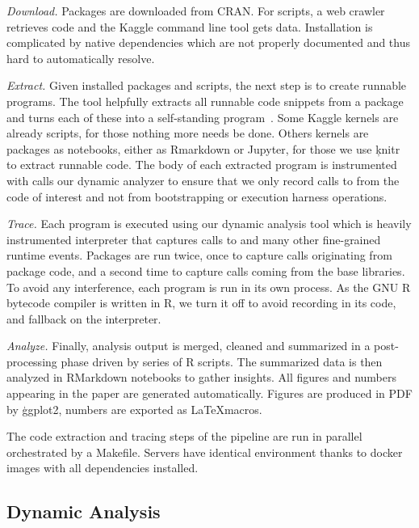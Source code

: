 \documentclass[screen,acmsmall]{acmart}
\begin{document}
\medskip
\begin{compactenum}
\item \emph{Download.} Packages are downloaded from CRAN. For scripts, a web
  crawler retrieves code and the Kaggle command line tool gets data.
  Installation is complicated by native dependencies which are not properly
  documented and thus hard to automatically resolve.
\item \emph{Extract.} Given installed packages and scripts, the next step is to
  create runnable programs. The \genthat tool helpfully extracts all runnable
  code snippets from a package and turns each of these into a self-standing
  program~\cite{issta18}. Some Kaggle kernels are already scripts, for those
  nothing more needs be done. Others kernels are packages as notebooks, either
  as Rmarkdown or Jupyter, for those we use \c{knitr} to extract runnable code.
  The body of each extracted program is instrumented with calls our dynamic
  analyzer to ensure that we only record calls to \eval from the code of
  interest and not from bootstrapping or execution harness operations.
\item \emph{Trace.} Each program is executed using our dynamic analysis tool
  which is heavily instrumented interpreter that captures calls to \eval and
  many other fine-grained runtime events. Packages are run twice, once to
  capture \eval calls originating from package code, and a second time to
  capture calls coming from the base libraries. To avoid any interference, each
  program is run in its own process.
  As the GNU R bytecode compiler is written in R, we turn it off
  to avoid recording \eval in its code, and fallback on the interpreter.
\item \emph{Analyze.} Finally, analysis output is merged, cleaned and summarized
  in a post-processing phase driven by series of R scripts. The summarized data
  is then analyzed in RMarkdown notebooks to gather insights. All figures and
  numbers appearing in the paper are generated automatically. Figures are
  produced in PDF by \c{ggplot2}, numbers are exported as \LaTeX macros.
\end{compactenum}

\medskip\noindent The code extraction and tracing steps of the pipeline are run
in parallel~\cite{GNUparallel} orchestrated by a Makefile. Servers have
identical environment thanks to docker images with all dependencies installed.

\subsection{Dynamic Analysis}
\end{document}
